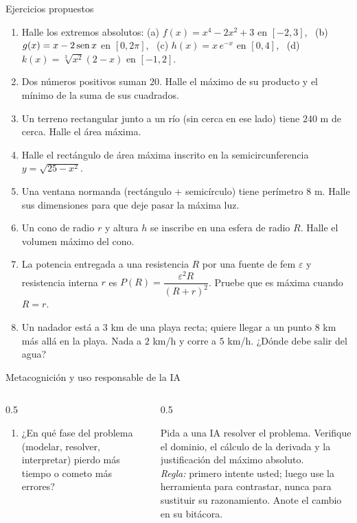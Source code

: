 \documentclass[10pt,aspectratio=169]{beamer}
\begin{document}
\begin{frame}{Ejercicios propuestos}
  \small
  \begin{ejercicio}
    \begin{enumerate}
      \item Halle los extremos absolutos: (a) $f(x)=x^4-2x^2+3$ en $[-2,3]$, \ (b) $g(x)=x-2\operatorname{sen} x$ en $[0,2\pi]$, \ (c) $h(x)=x\,e^{-x}$ en $[0,4]$, \ (d) $k(x)=\sqrt[3]{x^2}(2-x)$ en $[-1,2]$.
      \item Dos números positivos suman $20$. Halle el máximo de su producto y el mínimo de la suma de sus cuadrados.
      \item Un terreno rectangular junto a un río (sin cerca en ese lado) tiene $240$ m de cerca. Halle el área máxima.
      \item Halle el rectángulo de área máxima inscrito en la semicircunferencia $y=\sqrt{25-x^2}$.
      \item Una ventana normanda (rectángulo + semicírculo) tiene perímetro $8$ m. Halle sus dimensiones para que deje pasar la máxima luz.
      \item Un cono de radio $r$ y altura $h$ se inscribe en una esfera de radio $R$. Halle el volumen máximo del cono.
      \item La potencia entregada a una resistencia $R$ por una fuente de fem $\varepsilon$ y resistencia interna $r$ es $P(R)=\dfrac{\varepsilon^2R}{(R+r)^2}$. Pruebe que es máxima cuando $R=r$.
      \item Un nadador está a $3$ km de una playa recta; quiere llegar a un punto $8$ km más allá en la playa. Nada a $2$ km/h y corre a $5$ km/h. ¿Dónde debe salir del agua?
    \end{enumerate}
  \end{ejercicio}
\end{frame}

\begin{frame}{Metacognición y uso responsable de la IA}
  \small
  \begin{columns}[t]
    \begin{column}{0.5\textwidth}
      \begin{metacog}
        \begin{enumerate}
          \metacomun
          \item ¿En qué fase del problema (modelar, resolver, interpretar) pierdo más tiempo o cometo más errores?
        \end{enumerate}
      \end{metacog}
    \end{column}
    \begin{column}{0.5\textwidth}
      \begin{iabox}
        Pida a una IA resolver el problema. Verifique el dominio, el cálculo de la derivada y la justificación del máximo absoluto.\\[2pt]
        \textit{Regla:} primero intente usted; luego use la herramienta para contrastar, nunca para sustituir su razonamiento. Anote el cambio en su bitácora.
      \end{iabox}
    \end{column}
  \end{columns}
\end{frame}
\end{document}
